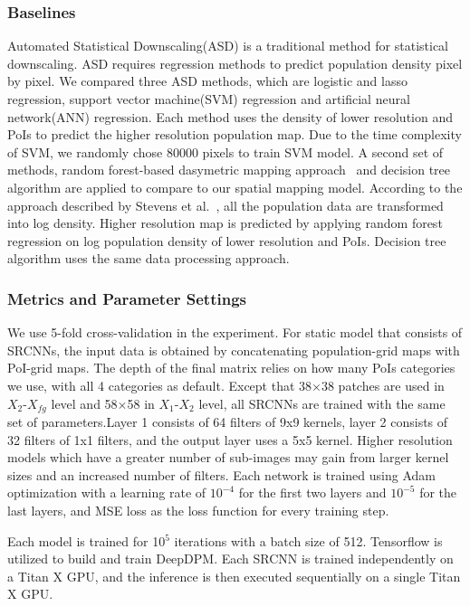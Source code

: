 \documentclass[letterpaper]{article} %
\begin{document}
\subsubsection{Baselines}
Automated Statistical Downscaling(ASD) \cite{hessami2008automated} is a traditional method for statistical downscaling. ASD requires regression methods to predict population density pixel by pixel. We compared three ASD methods, which are logistic and lasso regression, support vector machine(SVM) regression and artificial neural network(ANN) regression. Each method uses the density of lower resolution and PoIs to predict the higher resolution population map. Due to the time complexity of SVM, we randomly chose 80000 pixels to train SVM model.
A second set of methods, random forest-based dasymetric mapping approach~\cite{stevens2015disaggregating} and decision tree algorithm are applied to compare to our spatial mapping model. According to the approach described by Stevens et al.~\cite{stevens2015disaggregating}, all the population data are transformed into log density. Higher resolution map is predicted by applying random forest regression on log population density of lower resolution and PoIs. Decision tree algorithm uses the same data processing approach.

\subsubsection{Metrics and Parameter Settings}
We use 5-fold cross-validation in the experiment. For static model that consists of SRCNNs, the input data is obtained by concatenating population-grid maps with PoI-grid maps. The depth of the final matrix relies on how many PoIs categories we use, with all 4 categories as default. Except that 38$\times$38 patches are used in $X_2$-$X_{fg}$ level and 58$\times$58 in $X_1$-$X_2$ level, all SRCNNs are trained with the same set of parameters.Layer 1 consists of 64 filters of 9x9 kernels, layer 2 consists of 32 filters of 1x1 filters, and the output layer uses a 5x5 kernel. Higher resolution models which have a greater number of sub-images may gain from larger kernel sizes and an increased number of filters. Each network is trained using Adam optimization with a learning rate of $10^{-4}$ for the first two layers and $10^{-5}$ for the last layers, and MSE loss as the loss function for every training step.


Each model is trained for 10${^5}$ iterations with a batch size of 512. Tensorflow is utilized to build and train DeepDPM. Each SRCNN is trained independently on a Titan X GPU, and the inference is then executed sequentially on a single Titan X GPU.
\end{document}
